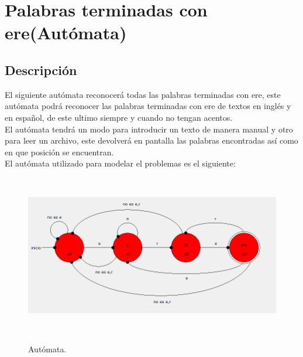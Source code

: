 \documentclass[12pt,letterpaper]{article}
\begin{document}
\section{Palabras terminadas con ere(Aut\'omata)}
\subsection{Descripci\'on}
\justify
El siguiente aut\'omata reconocer\'a todas las palabras terminadas con ere, este aut\'omata podr\'a reconocer las palabras terminadas con ere de textos en ingl\'es y en espa\~nol, de este ultimo siempre y cuando no tengan acentos.\\
El aut\'omata tendr\'a un modo para introducir un texto de manera manual y otro para leer un archivo, este devolver\'a en pantalla las palabras encontradas as\'i como en que posici\'on se encuentran.\\
El aut\'omata utilizado para modelar el problemas es el siguiente:
\begin{figure}[H]
\includegraphics[width=\textwidth, height=7cm]{diagramaautomata.png}
\label{fig:automataere}
\caption{Aut\'omata.}
\end{figure}
\end{document}

